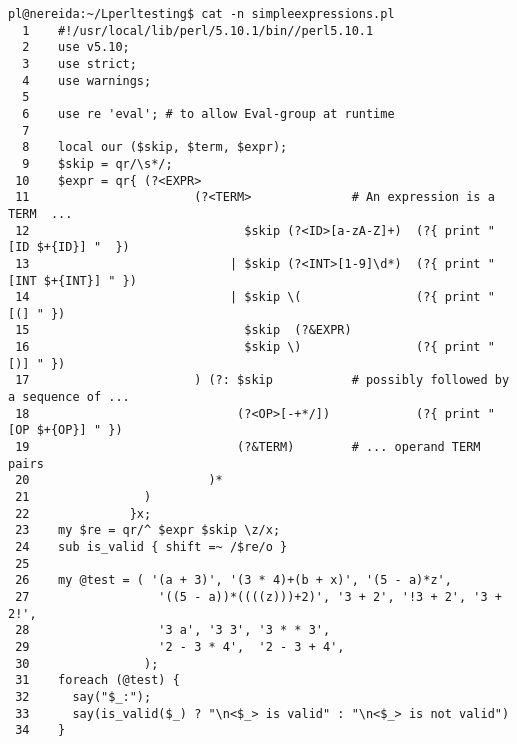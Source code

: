 \begin{latexonly}
\begin{verbatim}
pl@nereida:~/Lperltesting$ cat -n simpleexpressions.pl
  1    #!/usr/local/lib/perl/5.10.1/bin//perl5.10.1
  2    use v5.10;
  3    use strict;
  4    use warnings;
  5  
  6    use re 'eval'; # to allow Eval-group at runtime
  7  
  8    local our ($skip, $term, $expr);
  9    $skip = qr/\s*/;
 10    $expr = qr{ (?<EXPR>
 11                       (?<TERM>              # An expression is a TERM  ...
 12                              $skip (?<ID>[a-zA-Z]+)  (?{ print "[ID $+{ID}] "  })
 13                            | $skip (?<INT>[1-9]\d*)  (?{ print "[INT $+{INT}] " })
 14                            | $skip \(                (?{ print "[(] " })
 15                              $skip  (?&EXPR)
 16                              $skip \)                (?{ print "[)] " })
 17                       ) (?: $skip           # possibly followed by a sequence of ...
 18                             (?<OP>[-+*/])            (?{ print "[OP $+{OP}] " })
 19                             (?&TERM)        # ... operand TERM pairs
 20                         )*
 21                )
 22              }x;
 23    my $re = qr/^ $expr $skip \z/x;
 24    sub is_valid { shift =~ /$re/o }
 25  
 26    my @test = ( '(a + 3)', '(3 * 4)+(b + x)', '(5 - a)*z',
 27                  '((5 - a))*((((z)))+2)', '3 + 2', '!3 + 2', '3 + 2!',
 28                  '3 a', '3 3', '3 * * 3',
 29                  '2 - 3 * 4',  '2 - 3 + 4',
 30                );
 31    foreach (@test) {
 32      say("$_:");
 33      say(is_valid($_) ? "\n<$_> is valid" : "\n<$_> is not valid")
 34    }
\end{verbatim}
\end{latexonly}
